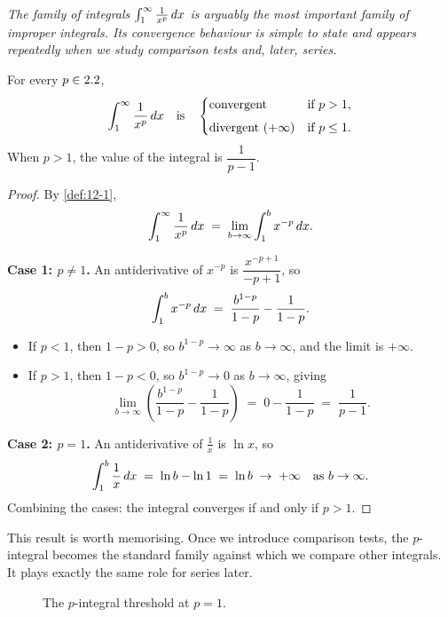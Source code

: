 \textit{The family of integrals $\int_{1}^{\infty}\frac{1}{x^{p}}\,dx$ is arguably the most important family of improper integrals.  Its convergence behaviour is simple to state and appears repeatedly when we study comparison tests and, later, series.}

\begin{theorem}
\label{thm:12-1}
For every $p\in2.2$,
\[
  \int_{1}^{\infty}\frac{1}{x^{p}}\,dx
  \quad\text{is}\quad
  \begin{cases}
    \text{convergent} & \text{if } p>1, \\[4pt]
    \text{divergent } (+\infty) & \text{if } p\le 1.
  \end{cases}
\]
When $p>1$, the value of the integral is $\dfrac{1}{p-1}$.
\end{theorem}

\begin{proof}
By \cref{def:12-1},
\[
  \int_{1}^{\infty}\frac{1}{x^{p}}\,dx
  \;=\; \lim_{b\to\infty}\int_{1}^{b}x^{-p}\,dx.
\]

\textbf{Case 1: $p\neq 1$.}  An antiderivative of $x^{-p}$ is $\dfrac{x^{-p+1}}{-p+1}$, so
\[
  \int_{1}^{b}x^{-p}\,dx
  \;=\; \frac{b^{1-p}}{1-p} - \frac{1}{1-p}.
\]
\begin{itemize}
  \item If $p<1$, then $1-p>0$, so $b^{1-p}\to\infty$ as $b\to\infty$, and the limit is $+\infty$.
  \item If $p>1$, then $1-p<0$, so $b^{1-p}\to 0$ as $b\to\infty$, giving
  \[
    \lim_{b\to\infty}\left(\frac{b^{1-p}}{1-p}-\frac{1}{1-p}\right)
    \;=\; 0 - \frac{1}{1-p}
    \;=\; \frac{1}{p-1}.
  \]
\end{itemize}

\textbf{Case 2: $p=1$.}  An antiderivative of $\frac{1}{x}$ is $\ln x$, so
\[
  \int_{1}^{b}\frac{1}{x}\,dx \;=\; \ln b - \ln 1 \;=\; \ln b \;\to\; +\infty
  \quad\text{as }b\to\infty.
\]
Combining the cases: the integral converges if and only if $p>1$.
\end{proof}

\begin{remark}
This result is worth memorising.  Once we introduce comparison tests, the $p$-integral becomes the standard family against which we compare other integrals.  It plays exactly the same role for series later.
\end{remark}

\begin{figure}[ht]
  \centering
  
  \caption{The $p$-integral threshold at $p=1$.}
  \label{fig:p-integral-comparison}
\end{figure}

